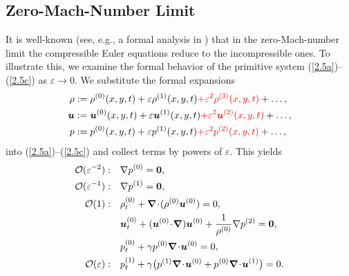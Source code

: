 \documentclass[A4paper,12pt,twoside]{article}
\numberwithin{equation}{section}
\numberwithin{figure}{section}
\numberwithin{table}{section}
\def\bnabla{\bm{\nabla}}
\newcommand{\ve}{\varepsilon}
\newcommand\eref[1]{(\ref{#1})}
\newcommand{\uvec}[2][3]{\boldsymbol{#2\mkern-#1mu}\mkern#1mu}
\newcommand{\lore}[1]{{\leavevmode\color{red} #1}}
\begin{document}
\subsection{\lore{Zero-Mach-Number Limit}}\label{sec22}
It is well-known (see, e.g., a formal analysis in \cite{Ala,MetSch}) that in the zero-Mach-number limit the compressible Euler equations
reduce to the incompressible ones. To illustrate this, we examine the formal behavior of the primitive system \eref{2.5a}--\eref{2.5c} as
$\ve\to0$. We substitute the formal expansions
\begin{align*}
\rho&:=\rho^{(0)}(x,y,t)+\ve\rho^{(1)}(x,y,t)\lore{+\ve^2\rho^{(3)}(x,y,t)}+\dots,\\
\bm u&:=\bm u^{(0)}(x,y,t)+\ve\bm u^{(1)}(x,y,t)\lore{+\ve^2\bm u^{(2)}(x,y,t)}+\dots,\\ 
p&:=p^{(0)}(x,y,t)+\ve p^{(1)}(x,y,t)\lore{+\ve^2 p^{(2)}(x,y,t)}+\dots,
\end{align*}
into \eref{2.5a}--\eref{2.5c} and collect terms by powers of $\ve$. This yields
\begin{equation}
\begin{aligned}
{\cal O}(\ve^{-2}):\quad&\nabla p^{(0)}=\uvec{0},\\
{\cal O}(\ve^{-1}):\quad&\nabla p^{(1)}=\uvec{0},\\
{\cal O}(1):\quad&\rho^{(0)}_t+\bnabla\!\cdot\!(\rho^{(0)}\bm u^{(0)})=0,\\
&\bm u^{(0)}_t+(\bm u^{(0)}\!\cdot\!\bnabla)\bm u^{(0)}+\frac{1}{\rho^{(0)}}\nabla p^{(2)}=\bm0,\\
&p^{(0)}_t+\gamma p^{(0)}\bnabla\!\cdot\!\bm u^{(0)}=0,\\
{\cal O}(\ve):\quad&p^{(1)}_t+\gamma\big(p^{(1)}\bnabla\!\cdot\!\bm u^{(0)}+p^{(0)}\bnabla\!\cdot\!\bm u^{(1)}\big)=0.
\end{aligned}
\label{3.1}
\end{equation}
\end{document}
